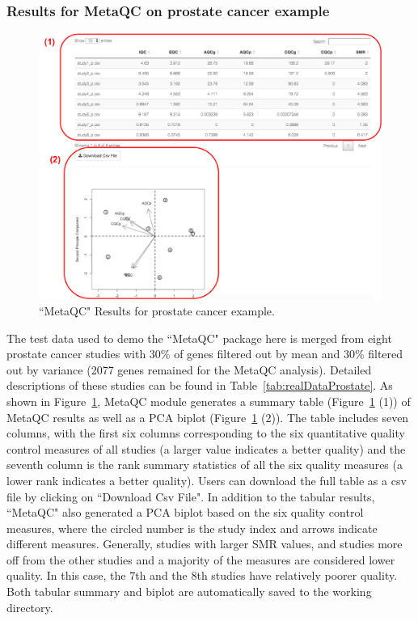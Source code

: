 \subsubsection{Results for MetaQC on prostate cancer example}




\begin{figure}[H]
\begin{center}
\includegraphics[scale=0.65]{./figure/metaQC/metaQCresult_Prostate.pdf}
\caption{``MetaQC" Results for prostate cancer example.}
\label{fig:MetaQCresult}
\end{center}
\end{figure}


The test data used to demo the ``MetaQC" package here is merged from eight prostate cancer studies with 30\% of genes filtered out by mean and 30\% filtered out by variance (2077 genes remained for the MetaQC analysis). 
Detailed descriptions of these studies can be found in Table~\ref{tab:realDataProstate}. 
As shown in Figure~\ref{fig:MetaQCresult}, 
MetaQC module generates a summary table (Figure~\ref{fig:MetaQCresult} {\color{red} (1)}) of MetaQC results 
as well as a PCA biplot (Figure~\ref{fig:MetaQCresult}  {\color{red} (2)}). 
The table includes seven columns, 
with the first six columns corresponding to the six quantitative quality control measures of all studies (a larger value indicates a better quality) and the seventh column is the rank summary statistics of all the six quality measures (a lower rank indicates a better quality). 
Users can download the full table as a csv file by clicking on ``Download Csv File". 
In addition to the tabular results, ``MetaQC" also generated a PCA biplot based on the six quality control measures, where the circled number is the study index and arrows indicate different measures. 
Generally, studies with larger SMR values, and studies more off from the other studies and a majority of the measures are considered lower quality. In this case, the 7th and the 8th studies have relatively poorer quality. Both tabular summary and biplot are automatically saved to the working directory. 


